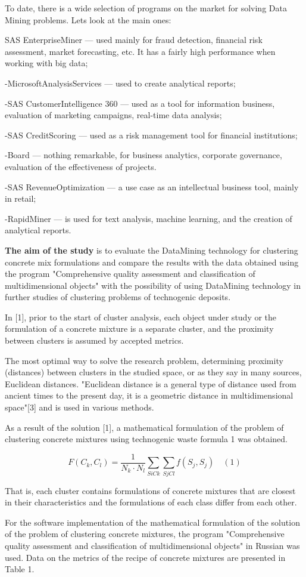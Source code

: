 \begin{multicols}{2}
To date, there is a wide selection of programs on the market for solving
Data Mining problems. Let\textquotesingle s look at the main ones:

SAS EnterpriseMiner --- used mainly for fraud detection, financial risk
assessment, market forecasting, etc. It has a fairly high performance
when working with big data;

-MicrosoftAnalysisServices --- used to create analytical reports;

-SAS CustomerIntelligence 360 --- used as a tool for information
business, evaluation of marketing campaigns, real-time data analysis;

-SAS CreditScoring --- used as a risk management tool for financial
institutions;

-Board --- nothing remarkable, for business analytics, corporate
governance, evaluation of the effectiveness of projects.

-SAS RevenueOptimization --- a use case as an intellectual business
tool, mainly in retail;

-RapidMiner --- is used for text analysis, machine learning, and the
creation of analytical reports.

{\bfseries The aim of the study} is to evaluate the DataMining technology
for clustering concrete mix formulations and compare the results with
the data obtained using the program "Comprehensive quality assessment
and classification of multidimensional objects" with the possibility of
using DataMining technology in further studies of clustering problems of
technogenic deposits.

In {[}1{]}, prior to the start of cluster analysis, each object under
study or the formulation of a concrete mixture is a separate cluster,
and the proximity between clusters is assumed by accepted metrics.

The most optimal way to solve the research problem, determining
proximity (distances) between clusters in the studied space, or as they
say in many sources, Euclidean distances. "Euclidean distance is a
general type of distance used from ancient times to the present day, it
is a geometric distance in multidimensional space"{[}3{]} and is used in
various methods.

As a result of the solution {[}1{]}, a mathematical formulation of the
problem of clustering concrete mixtures using technogenic waste formula
1 was obtained.

\[F(C_k, C_l) = \frac{1}{{N_k \cdot N_l}} \sum\limits_{SiCk} \sum\limits_{SjCl} f(S_j, S_j) \quad (1)\]

That is, each cluster contains formulations of concrete mixtures that
are closest in their characteristics and the formulations of each class
differ from each other.

For the software implementation of the mathematical formulation of the
solution of the problem of clustering concrete mixtures, the program
"Comprehensive quality assessment and classification of multidimensional
objects" in Russian was used. Data on the metrics of the recipe of
concrete mixtures are presented in Table 1.
\end{multicols}

